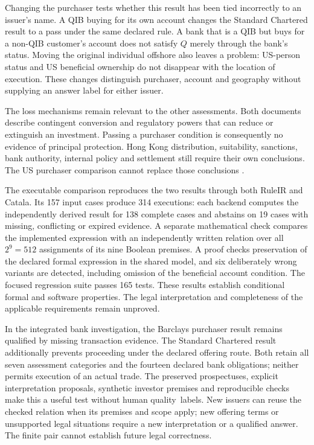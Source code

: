 \documentclass[12pt,a4paper,oneside,openany]{book}
\begin{document}
Changing the purchaser tests whether this result has been tied incorrectly to
an issuer's name. A QIB buying for its own account changes the Standard
Chartered result to a pass under the same declared rule. A bank that is a QIB
but buys for a non-QIB customer's account does not satisfy $Q$ merely through
the bank's status. Moving the original individual offshore also leaves a
problem: US-person status and US beneficial ownership do not disappear with
the location of execution. These changes distinguish purchaser, account and
geography without supplying an answer label for either issuer.

The loss mechanisms remain relevant to the other assessments. Both documents
describe contingent conversion and regulatory powers that can reduce or
extinguish an investment. Passing a purchaser condition is consequently no
evidence of principal protection. Hong Kong distribution, suitability,
sanctions, bank authority, internal policy and settlement still require their
own conclusions. The US purchaser comparison cannot replace those conclusions
\citep[Barclays cover and pp.~S-16, S-102; Standard Chartered pp.~i, 140--142]{barclayscoco2025,standardcharteredcoco2025}.

The executable comparison reproduces the two results through both RuleIR and
Catala. Its 157 input cases produce 314 executions: each backend computes the
independently derived result for 138 complete cases and abstains on 19 cases
with missing, conflicting or expired evidence. A separate mathematical check
compares the implemented expression with an independently written relation
over all $2^9=512$ assignments of its nine Boolean premises. A proof checks
preservation of the declared formal expression in the shared model, and six
deliberately wrong variants are detected, including omission of the beneficial
account condition. The focused regression suite passes 165 tests. These results
establish conditional formal and software properties. The legal interpretation
and completeness of the applicable requirements remain unproved.

In the integrated bank investigation, the Barclays purchaser result remains
qualified by missing transaction evidence. The Standard Chartered result
additionally prevents proceeding under the declared offering route. Both retain
all seven assessment categories and the fourteen declared bank obligations;
neither permits execution of an actual trade. The preserved prospectuses,
explicit interpretation proposals, synthetic investor premises and reproducible
checks make this a useful test without human \mbox{quality labels}. New issuers can
reuse the checked relation when its premises and scope apply; new offering
terms or unsupported legal situations require a new interpretation or a
qualified answer. The finite pair cannot establish future legal correctness.
\end{document}
